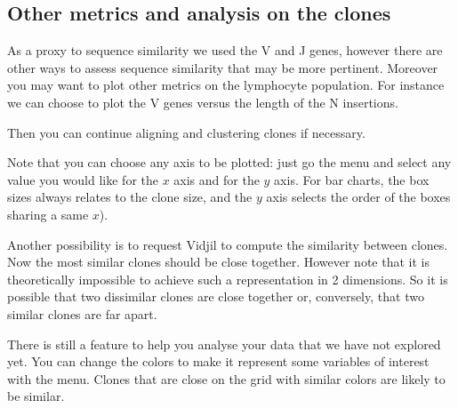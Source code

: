 \documentclass[10pt]{article}
\begin{document}


\subsection{Other metrics and analysis on the clones}

As a proxy to sequence similarity we used the V and J genes, however there are
other ways to assess sequence similarity that may be more pertinent.
Moreover you may want to plot other metrics on the lymphocyte population.
%
For instance we can choose to plot the V genes versus the length of the N
insertions.

Then you can continue aligning and clustering clones if necessary.


Note that you can choose any axis to be plotted: just go the  menu and
select any value you would like for the $x$ axis and for the $y$ axis.
For bar charts, the box sizes always relates to the clone size,
and the $y$ axis selects the order of the boxes sharing a same $x$).



Another possibility is to request Vidjil to compute the similarity between
clones.
Now the most similar clones should be close together. However note that it is
theoretically impossible to achieve such a representation in 2 dimensions. So
it is possible that two dissimilar clones are close together or, conversely,
that two similar clones are far apart.


There is still a feature to help you analyse your data that we have not
explored yet.
You can change the colors to make it represent some variables of interest
with the  menu.
Clones that are close on the grid with similar colors are likely to
be similar.
\end{document}
